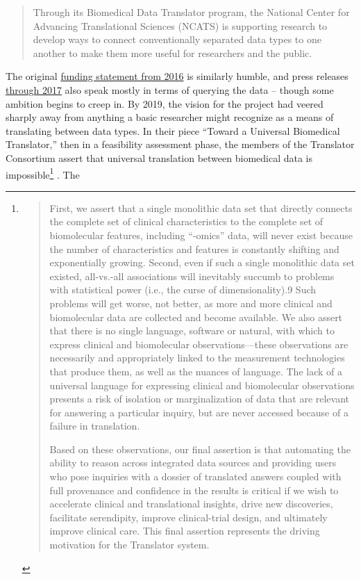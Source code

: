 \begin{quote}
Through its Biomedical Data Translator program, the National Center for
Advancing Translational Sciences (NCATS) is supporting research to
develop ways to connect conventionally separated data types to one
another to make them more useful for researchers and the public. \citep{NIHStrategicPlan2018} 
\end{quote}

The original
\href{https://web.archive.org/web/20210709100523/https://ncats.nih.gov/news/releases/2016/feasibility-assessment-translator}{funding
statement from 2016} is similarly humble, and press releases
\href{https://web.archive.org/web/20210709171335/https://ncats.nih.gov/pubs/features/translator}{through
2017} also speak mostly in terms of querying the data -- though some
ambition begins to creep in. By 2019, the vision for the project had
veered sharply away from anything a basic researcher might recognize as
a means of translating between data types. In their piece ``Toward a
Universal Biomedical Translator,'' then in a feasibility assessment
phase, the members of the Translator Consortium assert that universal
translation between biomedical data is impossible\footnote{\begin{quote}
  First, we assert that a single monolithic data set that directly
  connects the complete set of clinical characteristics to the complete
  set of biomolecular features, including ``-omics'' data, will never
  exist because the number of characteristics and features is constantly
  shifting and exponentially growing. Second, even if such a single
  monolithic data set existed, all-vs.-all associations will inevitably
  succumb to problems with statistical power (i.e., the curse of
  dimensionality).9 Such problems will get worse, not better, as more
  and more clinical and biomolecular data are collected and become
  available. We also assert that there is no single language, software
  or natural, with which to express clinical and biomolecular
  observations---these observations are necessarily and appropriately
  linked to the measurement technologies that produce them, as well as
  the nuances of language. The lack of a universal language for
  expressing clinical and biomolecular observations presents a risk of
  isolation or marginalization of data that are relevant for answering a
  particular inquiry, but are never accessed because of a failure in
  translation.

  Based on these observations, our final assertion is that automating
  the ability to reason across integrated data sources and providing
  users who pose inquiries with a dossier of translated answers coupled
  with full provenance and confidence in the results is critical if we
  wish to accelerate clinical and translational insights, drive new
  discoveries, facilitate serendipity, improve clinical-trial design,
  and ultimately improve clinical care. This final assertion represents
  the driving motivation for the Translator system. \citep{consortiumUniversalBiomedicalData2019} 
  \end{quote}}\citep{consortiumUniversalBiomedicalData2019} . The
